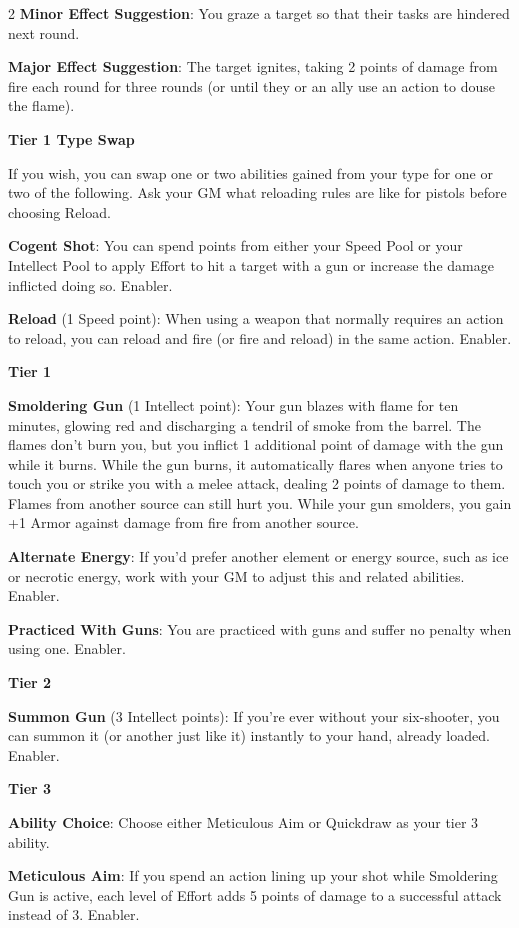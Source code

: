 \begin{multicols}{2}
\textbf{Minor Effect Suggestion}: You graze a target so that their tasks are hindered next round. 

\textbf{Major Effect Suggestion}: The target ignites, taking 2 points of damage from fire each round for three rounds (or until they or an ally use an action to douse the flame).

\textbf{Tier 1 Type Swap}
 
If you wish, you can swap one or two abilities gained from your type for one or two of the following. Ask your GM what reloading rules are like for pistols before choosing Reload. 

\textbf{Cogent Shot}: You can spend points from either your Speed Pool or your Intellect Pool to apply Effort to hit a target with a gun or increase the damage inflicted doing so. Enabler. 

\textbf{Reload} (1 Speed point): When using a weapon that normally requires an action to reload, you can reload and fire (or fire and reload) in the same action. Enabler. 

\textbf{Tier 1} 

\textbf{Smoldering Gun} (1 Intellect point): Your gun blazes with flame for ten minutes, glowing red and discharging a tendril of smoke from the barrel. The flames don’t burn you, but you inflict 1 additional point of damage with the gun while it burns. While the gun burns, it automatically flares when anyone tries to touch you or strike you with a melee attack, dealing 2 points of damage to them. Flames from another source can still hurt you. While your gun smolders, you gain +1 Armor against damage from fire from another source. 

\textbf{Alternate Energy}: If you’d prefer another element or energy source, such as ice or necrotic energy, work with your GM to adjust this and related abilities. Enabler. 

\textbf{Practiced With Guns}: You are practiced with guns and suffer no penalty when using one. Enabler. 

\textbf{Tier 2} 

\textbf{Summon Gun} (3 Intellect points): If you’re ever without your six-shooter, you can summon it (or another just like it) instantly to your hand, already loaded. Enabler. 

\textbf{Tier 3} 

\textbf{Ability Choice}: Choose either Meticulous Aim or Quickdraw as your tier 3 ability. 

\textbf{Meticulous Aim}: If you spend an action lining up your shot while Smoldering Gun is active, each level of Effort adds 5 points of damage to a successful attack instead of 3. Enabler. 


\end{multicols}
